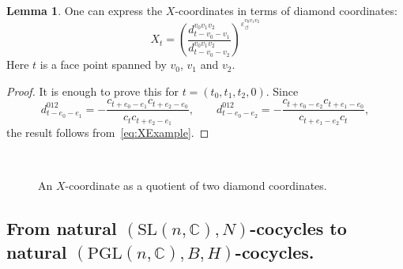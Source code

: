 \documentclass[12pt]{amsart}
\theoremstyle{definition}
\newtheorem{lemma}[theorem]{Lemma}
\numberwithin{equation}{section}
\def\SL{\mathrm{SL}}
\def\PGL{\mathrm{PGL}}
\def\C{\mathbb{C}}
\begin{document}
\begin{lemma}\label{lemma:XandDiamonds} One can express the $X$-coordinates in terms of diamond coordinates: 
\begin{equation}
X_t=\left(\frac{d^{v_0v_1v_2}_{t-v_0-v_1}}{d^{v_0v_1v_2}_{t-v_0-v_2}}\right)^{\varepsilon_\circlearrowleft^{v_0v_1v_2}}
\end{equation}
Here $t$ is a face point spanned by $v_0$, $v_1$ and $v_2$. %
\end{lemma}
\begin{proof}
It is enough to prove this for $t=(t_0,t_1,t_2,0)$. Since
\begin{equation}
d^{012}_{t-e_0-e_1}=-\frac{c_{t+e_0-e_1}c_{t+e_2-e_0}}{c_tc_{t+e_2-e_1}},\qquad d^{012}_{t-e_0-e_2}=-\frac{c_{t+e_0-e_2}c_{t+e_1-e_0}}{c_{t+e_1-e_2}c_t},
\end{equation}
the result follows from~\eqref{eq:XExample}.
\end{proof}


\begin{figure}[htb]
\begin{center}
\begin{minipage}[b]{0.45\textwidth}
\begin{center}
\scalebox{0.7}{
}
\end{center}
\end{minipage}
\hfill
\begin{minipage}[b]{0.45\textwidth}
\begin{center}
\scalebox{0.7}{
}
\end{center}
\end{minipage}\\
\begin{minipage}[t]{0.45\textwidth}
\caption{Exponents of the Ptolemy coordinates involved in the $X$-coordinate at $t$.}
\end{minipage}
\begin{minipage}[t]{0.45\textwidth}
\begin{center}
\caption{An $X$-coordinate as a quotient of two diamond coordinates.}
\end{center}
\end{minipage}
\end{center}
\end{figure}


\subsection{From natural $(\SL(n,\C),N)$-cocycles to natural $(\PGL(n,\C),B,H)$-cocycles.}
\end{document}
